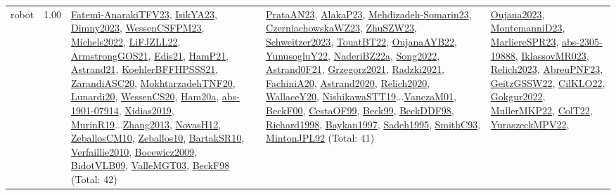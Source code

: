 {\begin{longtable}{p{3cm}r>{\raggedright\arraybackslash}p{6cm}>{\raggedright\arraybackslash}p{6cm}>{\raggedright\arraybackslash}p{8cm}}
\index{robot}\index{ApplicationAreas!robot}robot &  1.00 & \hyperref[detail:Fatemi-AnarakiTFV23]{Fatemi-AnarakiTFV23}, \hyperref[detail:IsikYA23]{IsikYA23}, \hyperref[detail:Dimny2023]{Dimny2023}, \hyperref[detail:WessenCSFPM23]{WessenCSFPM23}, \hyperref[detail:Michels2022]{Michels2022}, \hyperref[detail:LiFJZLL22]{LiFJZLL22}, \hyperref[detail:ArmstrongGOS21]{ArmstrongGOS21}, \hyperref[detail:Edis21]{Edis21}, \hyperref[detail:HamP21]{HamP21}, \hyperref[detail:Astrand21]{Astrand21}, \hyperref[detail:KoehlerBFFHPSSS21]{KoehlerBFFHPSSS21}, \hyperref[detail:ZarandiASC20]{ZarandiASC20}, \hyperref[detail:MokhtarzadehTNF20]{MokhtarzadehTNF20}, \hyperref[detail:Lunardi20]{Lunardi20}, \hyperref[detail:WessenCS20]{WessenCS20}, \hyperref[detail:Ham20a]{Ham20a}, \hyperref[detail:abs-1901-07914]{abs-1901-07914}, \hyperref[detail:Xidias2019]{Xidias2019}, \hyperref[detail:MurinR19]{MurinR19}...\hyperref[detail:Zhang2013]{Zhang2013}, \hyperref[detail:NovasH12]{NovasH12}, \hyperref[detail:ZeballosCM10]{ZeballosCM10}, \hyperref[detail:Zeballos10]{Zeballos10}, \hyperref[detail:BartakSR10]{BartakSR10}, \hyperref[detail:Verfaillie2010]{Verfaillie2010}, \hyperref[detail:Bocewicz2009]{Bocewicz2009}, \hyperref[detail:BidotVLB09]{BidotVLB09}, \hyperref[detail:ValleMGT03]{ValleMGT03}, \hyperref[detail:BeckF98]{BeckF98} (Total: 42) & \hyperref[detail:PrataAN23]{PrataAN23}, \hyperref[detail:AlakaP23]{AlakaP23}, \hyperref[detail:Mehdizadeh-Somarin23]{Mehdizadeh-Somarin23}, \hyperref[detail:CzerniachowskaWZ23]{CzerniachowskaWZ23}, \hyperref[detail:ZhuSZW23]{ZhuSZW23}, \hyperref[detail:Schweitzer2023]{Schweitzer2023}, \hyperref[detail:TouatBT22]{TouatBT22}, \hyperref[detail:OujanaAYB22]{OujanaAYB22}, \hyperref[detail:YunusogluY22]{YunusogluY22}, \hyperref[detail:NaderiBZ22a]{NaderiBZ22a}, \hyperref[detail:Song2022]{Song2022}, \hyperref[detail:Astrand0F21]{Astrand0F21}, \hyperref[detail:Grzegorz2021]{Grzegorz2021}, \hyperref[detail:Radzki2021]{Radzki2021}, \hyperref[detail:FachiniA20]{FachiniA20}, \hyperref[detail:Astrand2020]{Astrand2020}, \hyperref[detail:Relich2020]{Relich2020}, \hyperref[detail:WallaceY20]{WallaceY20}, \hyperref[detail:NishikawaSTT19]{NishikawaSTT19}...\hyperref[detail:VanczaM01]{VanczaM01}, \hyperref[detail:BeckF00]{BeckF00}, \hyperref[detail:CestaOF99]{CestaOF99}, \hyperref[detail:Beck99]{Beck99}, \hyperref[detail:BeckDDF98]{BeckDDF98}, \hyperref[detail:Richard1998]{Richard1998}, \hyperref[detail:Baykan1997]{Baykan1997}, \hyperref[detail:Sadeh1995]{Sadeh1995}, \hyperref[detail:SmithC93]{SmithC93}, \hyperref[detail:MintonJPL92]{MintonJPL92} (Total: 41) & \hyperref[detail:Oujana2023]{Oujana2023}, \hyperref[detail:MontemanniD23]{MontemanniD23}, \hyperref[detail:MarliereSPR23]{MarliereSPR23}, \hyperref[detail:abs-2305-19888]{abs-2305-19888}, \hyperref[detail:IklassovMR023]{IklassovMR023}, \hyperref[detail:Relich2023]{Relich2023}, \hyperref[detail:AbreuPNF23]{AbreuPNF23}, \hyperref[detail:GeitzGSSW22]{GeitzGSSW22}, \hyperref[detail:CilKLO22]{CilKLO22}, \hyperref[detail:Gokgur2022]{Gokgur2022}, \hyperref[detail:MullerMKP22]{MullerMKP22}, \hyperref[detail:ColT22]{ColT22}, \hyperref[detail:YuraszeckMPV22]{YuraszeckMPV22}, 
\end{longtable}}
